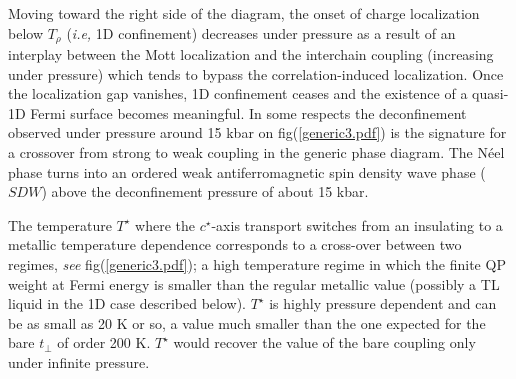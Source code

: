\documentclass[11pt]{article} %
\begin{document}
Moving toward the right side of the diagram, the onset of charge localization below $T_{\rho}$  (\textit{i.e,} 1D confinement) decreases under pressure as a result of an interplay between the Mott localization and the interchain coupling (increasing under pressure) which tends to bypass the correlation-induced localization. Once the localization gap vanishes, 1D confinement ceases and the existence of a quasi-1D Fermi surface becomes meaningful\cite{Giamarchi97,Bourbonnais99,Biermann01}. In some respects the deconfinement observed under pressure around 15 kbar on fig(\ref{generic3.pdf}) is the signature for a crossover from strong to weak coupling in the generic phase diagram. The N\'eel phase turns into  an ordered  weak antiferromagnetic spin density wave phase ($SDW$)  above the deconfinement pressure of about 15 kbar.

The temperature $T^{\star}$ where the $c^{\star}$-axis transport switches from an insulating
to a metallic temperature dependence\cite{Auban04} corresponds to a cross-over between two regimes, \textit{see} fig(\ref{generic3.pdf}); a high temperature regime  in which the  finite QP
weight at  Fermi energy is smaller than the regular metallic value (possibly a TL liquid in the 1D case described below). $T^{\star}$ is highly pressure dependent and can be as small as 20 K or so, a value much smaller than the one expected for the bare $t_{\perp}$ of order 200 K. $T^{\star}$ would recover the value of the bare coupling only under infinite pressure.



\end{document}
